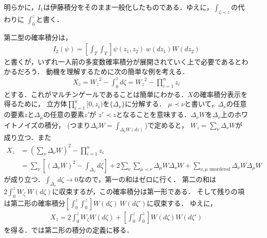 	明らかに，$I_{1}$は伊藤積分をそのまま一般化したものである．ゆえに，$\int_{\zeta \prec z}$の代わりに
	$\int_{0}^{z}$と書く．
	
	第二型の確率積分は，
	\begin{align}
		I_{2}(\psi) = \left[\int_{T}\int_{T}\right] \psi(z_{1},z_{2})\ w(dz_{1}) W(dz_{2})
	\end{align}
	と書くが，いずれ一人前の多変数確率積分が展開されていく上で必要であるとわかるだろう．
	動機を理解するために次の簡単な例を考える．
	\begin{align}
		X_{z} = {W_{z}}^{2} - \int_{0}^{z} d\zeta = {W_{z}}^{2} - \prod_{i=1}^{n} z_{i}
	\end{align}
	とする．これがマルチンゲールであることは簡単にわかる．$X$の確率積分表示を得るために，
	立方体$\prod_{i=1}^{n}[0,z_{i})$を$\{\Delta_{\nu}\}$に分解する．
	$\mu \prec \nu$と書いて，$\Delta_{\nu}$の任意の要素$z$と$\Delta_{\mu}$の任意の要素$z'$が
	$z' \prec z$となることを意味する．$\Delta_{\nu} W$を$\Delta_{\nu}$上のホワイトノイズの積分，
	(つまり$\Delta_{\nu} W = \int_{\Delta_{\nu} W(dz)}$)で定めると，
	$W_{z} = \sum_{\nu} \Delta_{\nu} W$が成り立つ．また
	\begin{align}
		X_{z} &= \left(\sum_{\nu} \Delta_{\nu} W\right)^{2} - \prod_{i=1}^{n} z_{i} \\
		&= \sum_{\nu}\left[\left(\Delta_{\nu} W\right)^{2}
		- \int_{\Delta_{\nu}} d\zeta\right]
		+ 2 \sum_{\nu} \sum_{\mu \prec \nu} \Delta_{\mu} W \Delta_{\nu} W
		+ \sum_{\nu,\mu \mbox{ unordered}} \Delta_{\nu} W \Delta_{\mu} W
	\end{align}
	が成り立つ．$\int_{\Delta_{\nu}} d\zeta \longrightarrow 0$なので，第一の和はゼロに行く．
	第二の和は$2 \int_{0}^{z} W_{\zeta}\ W(d\zeta)$に収束するが，この確率積分は第一形である．
	そして残りの項は第二形の確率積分$\left[\int_{0}^{z} \int_{0}^{z}\right] W(d\zeta)\ W(d\zeta')$に収束する．
	ゆえに，
	\begin{align}
		X_{z} = 2 \int_{0}^{z} W_{\zeta}W(d\zeta)
		+ \left[\int_{0}^{z} \int_{0}^{z}\right] W(d\zeta) W(d\zeta')
	\end{align}
	を得る．では第二形の積分の定義に移る．
	
